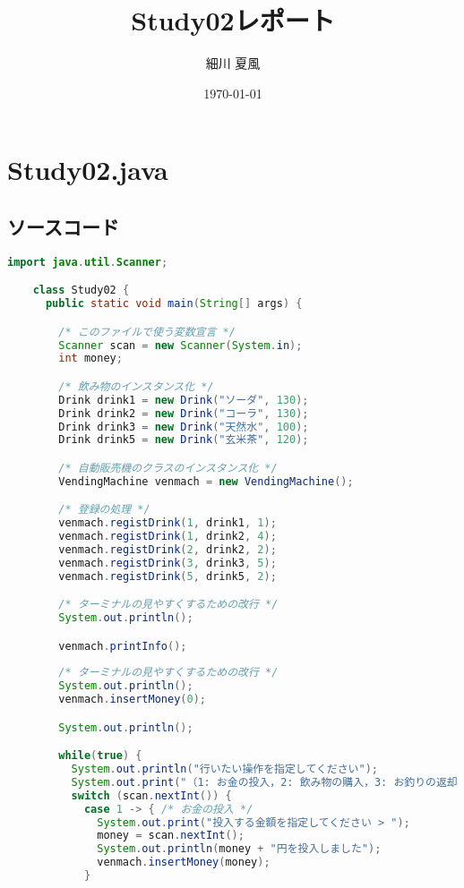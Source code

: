 \documentclass{jlreq}
\title{Study02レポート}
\author{細川 夏風}
\date{\today}
\begin{document}
  \maketitle

  \section{Study02.java}

  \subsection{ソースコード}

  \begin{lstlisting}[caption=Study02.java, label=code:in, language=Java]
    import java.util.Scanner;

    class Study02 {
      public static void main(String[] args) {

        /* このファイルで使う変数宣言 */
        Scanner scan = new Scanner(System.in);
        int money;

        /* 飲み物のインスタンス化 */
        Drink drink1 = new Drink("ソーダ", 130);
        Drink drink2 = new Drink("コーラ", 130);
        Drink drink3 = new Drink("天然水", 100);
        Drink drink5 = new Drink("玄米茶", 120);

        /* 自動販売機のクラスのインスタンス化 */
        VendingMachine venmach = new VendingMachine();

        /* 登録の処理 */
        venmach.registDrink(1, drink1, 1);
        venmach.registDrink(1, drink2, 4);
        venmach.registDrink(2, drink2, 2);
        venmach.registDrink(3, drink3, 5);
        venmach.registDrink(5, drink5, 2);

        /* ターミナルの見やすくするための改行 */
        System.out.println();

        venmach.printInfo();
        
        /* ターミナルの見やすくするための改行 */
        System.out.println();
        venmach.insertMoney(0);

        System.out.println();

        while(true) {
          System.out.println("行いたい操作を指定してください");
          System.out.print("（1: お金の投入，2: 飲み物の購入，3: お釣りの返却，4: 終了 > ");
          switch (scan.nextInt()) {
            case 1 -> { /* お金の投入 */
              System.out.print("投入する金額を指定してください > ");
              money = scan.nextInt();
              System.out.println(money + "円を投入しました");
              venmach.insertMoney(money);
            }


\end{lstlisting}
\end{document}
